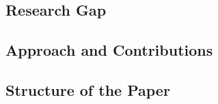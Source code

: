 \subsection{Research Gap}

\subsection{Approach and Contributions}

\subsection{Structure of the Paper}
